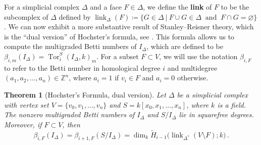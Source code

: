 \documentclass[12pt,leqno]{amsart}
\newtheorem{theorem}[lemma]{Theorem}
\theoremstyle{definition}
\begin{document}
%
For a simplicial complex $\Delta$ and a face $F \in \Delta$, we define the
\textbf{link} of $F$ to be the subcomplex of $\Delta$ defined by
$\operatorname{link}_\Delta(F) \coloneq \{ G \in \Delta \ | \ F \cup G \in
\Delta \ \text{ and } \ F \cap G = \varnothing \}$. We can now exhibit a more
substantive result of Stanley--Reisner theory, which is the ``dual version''
of Hochster's formula, see \cite[Corollary~1.40]{MS}. This formula allows us
to compute the multigraded Betti numbers of $I_\Delta$, which are defined to
be $\beta_{i,m}(I_\Delta) = \operatorname{Tor}_i^S(I_\Delta, k)_m$. For a
subset $F \subset V$, we will use the notation $\beta_{i,F}$ to refer to the
Betti number in homological degree $i$ and multidegree
$(a_1, a_2, \dotsc, a_n) \in \mathbb{Z}^n$, where $a_i = 1$ if $v_i \in F$ and
$a_i = 0$ otherwise.
%
\begin{theorem}[Hochster's Formula, dual version]
  Let $\Delta$ be a simplicial complex with vertex set
  $V = \{v_0,v_1,\dotsc,v_n\}$ and $S = k[x_0,x_1,\dotsc,x_n]$, where $k$ is a
  field. The nonzero multigraded Betti numbers of $I_\Delta$ and $S/I_\Delta$
  lie in squarefree degrees. Moreover, if $F \subset V$, then
  \[
    \beta_{i,F} (I_\Delta) = \beta_{i+1,F} (S/I_\Delta) = \dim_k \widetilde
    H_{i-1} \big( \operatorname{link}_{\Delta^*}(V \setminus F); k \big) \, .
  \]
\end{theorem}
%
\end{document}
